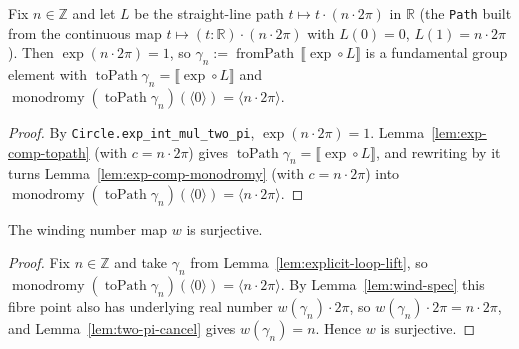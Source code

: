 \begin{lemma}
    \label{lem:explicit-loop-lift}
    \leanok
    Fix \(n \in \mathbb{Z}\) and let \(L\) be the straight-line path
    \(t \mapsto t \cdot (n\cdot 2\pi)\) in \(\mathbb{R}\) (the \texttt{Path} built from the continuous map
    \(t \mapsto (t : \mathbb{R}) \cdot (n\cdot 2\pi)\) with \(L(0) = 0\), \(L(1) = n\cdot 2\pi\)). Then
    \(\exp(n\cdot 2\pi) = 1\), so \(\gamma_n := \operatorname{fromPath}\,\llbracket \exp\circ L\rrbracket\)
    is a fundamental group element with \(\operatorname{toPath}\gamma_n = \llbracket\exp\circ L\rrbracket\)
    and \(\operatorname{monodromy}(\operatorname{toPath}\gamma_n)(\langle 0\rangle) = \langle n\cdot 2\pi\rangle\).
\end{lemma}
\begin{proof}
    By \texttt{Circle.exp\_int\_mul\_two\_pi}, \(\exp(n\cdot 2\pi) = 1\). Lemma~\ref{lem:exp-comp-topath}
    (with \(c = n\cdot 2\pi\)) gives \(\operatorname{toPath}\gamma_n = \llbracket\exp\circ L\rrbracket\),
    and rewriting by it turns Lemma~\ref{lem:exp-comp-monodromy} (with \(c = n\cdot 2\pi\)) into
    \(\operatorname{monodromy}(\operatorname{toPath}\gamma_n)(\langle 0\rangle) = \langle n\cdot 2\pi\rangle\).
\end{proof}

\begin{lemma}
    \label{lem:wind-surjective}
    \leanok
    The winding number map \(w\) is surjective.
\end{lemma}
\begin{proof}
    Fix \(n \in \mathbb{Z}\) and take \(\gamma_n\) from Lemma~\ref{lem:explicit-loop-lift}, so
    \(\operatorname{monodromy}(\operatorname{toPath}\gamma_n)(\langle 0\rangle) = \langle n\cdot 2\pi\rangle\).
    By Lemma~\ref{lem:wind-spec} this fibre point also has underlying real number
    \(w(\gamma_n)\cdot 2\pi\), so \(w(\gamma_n)\cdot 2\pi = n\cdot 2\pi\), and
    Lemma~\ref{lem:two-pi-cancel} gives \(w(\gamma_n) = n\). Hence \(w\) is surjective.
\end{proof}

